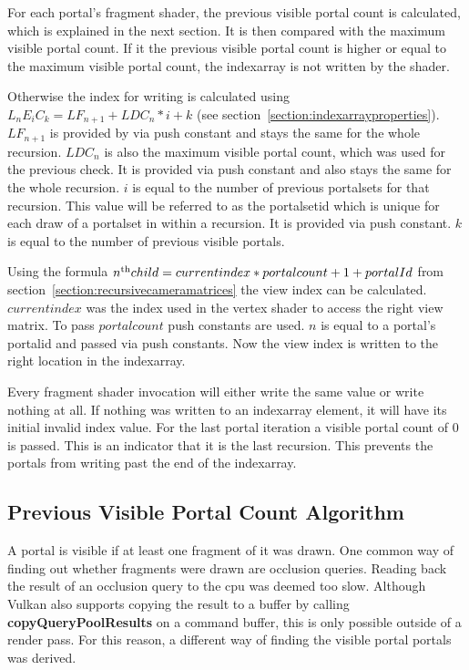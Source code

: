 For each portal's fragment shader, the previous visible portal count is calculated, which is explained in the next section. It is then compared with the maximum visible portal count. If it the previous visible portal count is higher or equal to the maximum visible portal count, the \gls{indexarray} is not written by the shader.

Otherwise the index for writing is calculated using $L_nE_iC_k = LF_{n+1} + LDC_{n} * i + k$ (see section~\ref{section:indexarrayproperties}). $LF_{n+1}$ is provided by via push constant and stays the same for the whole recursion. $LDC_{n}$ is also the maximum visible portal count, which was used for the previous check. It is provided via push constant and also stays the same for the whole recursion. $i$ is equal to the number of previous \glspl{portalset} for that recursion. This value will be referred to as the \gls{portalsetid} which is unique for each draw of a \gls{portalset} in within a recursion. It is provided via push constant. $k$ is equal to the number of previous visible portals.

Using the formula $ n\textsuperscript{th} child = current index * portalcount + 1 + portalId$ from section~\ref{section:recursivecameramatrices} the view index can be calculated. $currentindex$ was the index used in the vertex shader to access the right view matrix. To pass $portalcount$ push constants are used. $n$ is equal to a portal's \gls{portalid} and passed via push constants. Now the view index is written to the right location in the \gls{indexarray}.

Every fragment shader invocation will either write the same value or write nothing at all. If nothing was written to an \gls{indexarray} element, it will have its initial invalid index value. For the last portal iteration a visible portal count of 0 is passed. This is an indicator that it is the last recursion. This prevents the portals from writing past the end of the \gls{indexarray}.

\subsection{Previous Visible Portal Count Algorithm}
\label{section:visibleportalcount}
A portal is visible if at least one fragment of it was drawn. One common way of finding out whether fragments were drawn are occlusion queries. Reading back the result of an occlusion query to the \gls{cpu} was deemed too slow. Although Vulkan also supports copying the result to a buffer by calling \textbf{copyQueryPoolResults} on a command buffer, this is only possible outside of a render pass. For this reason, a different way of finding the visible portal portals was derived.

